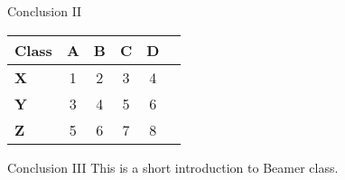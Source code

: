 \documentclass{beamer}
\begin{document}
\begin{frame}{Conclusion II}
  \begin{center}
    \begin{tabular}{lccccc}
      \bf Class & \bf A & \bf B & \bf C & \bf D \\
      \hline
      \pause \bf X     & 1 & 2 & 3 & 4 \\
      \pause \bf Y     & 3 & 4 & 5 & 6 \\
      \pause \bf Z     &5&6&7&8
    \end{tabular}
  \end{center}
\end{frame}

\begin{frame}{Conclusion III}
  This is a short introduction to Beamer class.
\end{frame}
\end{document}
